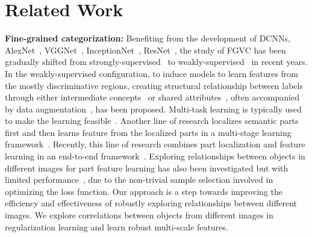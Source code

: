 \documentclass[10pt,twocolumn,letterpaper]{article}
\begin{document}
\section{Related Work}
\label{sec:rlwk}
\textbf{Fine-grained categorization:} Benefiting from the development of DCNNs, \eg AlexNet~\cite{alexnet12hiton}, VGGNet~\cite{vggnet15zisserman}, InceptionNet~\cite{googlenet15Szegedy}, ResNet~\cite{resnet16kaiming}, the study of FGVC has been gradually shifted from strongly-supervised~\cite{pncnn@perona,dlac@cvpr,spdacnn@cvpr} to weakly-supervised~\cite{racnn@mei,dfbnet18larry,mamc18eccv} in recent years. In the weakly-supervised configuration, to induce models to learn features from the mostly discriminative regions, creating structural relationship between labels through either intermediate concepts~\cite{hyperlabels@cvpr,multigranularity@iccv} or shared attributes~\cite{bigraph@cvpr,describeattr@aaai}, often accompanied by data augmentation~\cite{kp@cvpr}, has been proposed. Multi-task learning is typically used to make the learning feasible~\cite{hyperlabels@cvpr,multigranularity@iccv,embeddinglabel@cvpr}. 
Another line of research localizes semantic parts first and then learns feature from the localized parts in a multi-stage learning framework~\cite{twolevelattention@cvpr,neuralconstellations@iccv,pickfilter@tianqi}. Recently, this line of research combines part localization and feature learning in an end-to-end framework~\cite{racnn@mei,macnn@mei,ram@arxiv,dfbnet18larry}. Exploring relationships between objects in different images for part feature learning has also been investigated but with limited performance~\cite{mamc18eccv}, due to the non-trivial sample selection involved in optimizing the loss function. Our approach is a step towards improving the efficiency and effectiveness of robustly exploring relationships between different images. We explore correlations between objects from different images in regularization learning and learn robust multi-scale features.
\end{document}
